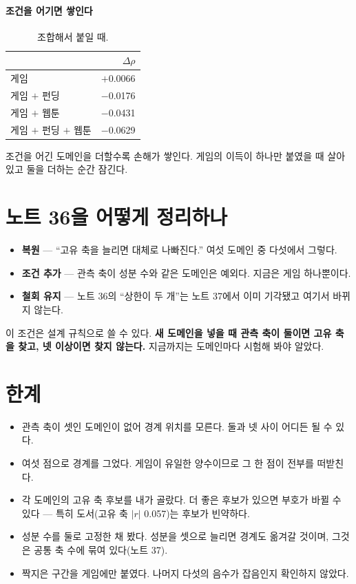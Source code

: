 \documentclass[10pt]{article}
\begin{document}
\paragraph{조건을 어기면 쌓인다}
\begin{table}[t]
\centering\tsize
\caption{조합해서 붙일 때.}
\begin{tabular}{lr}
\toprule
& $\Delta\rho$ \\
\midrule
게임 & $+$0.0066 \\
게임 $+$ 펀딩 & $-$0.0176 \\
게임 $+$ 웹툰 & $-$0.0431 \\
게임 $+$ 펀딩 $+$ 웹툰 & $-$0.0629 \\
\bottomrule
\end{tabular}
\end{table}

조건을 어긴 도메인을 더할수록 손해가 쌓인다. 게임의 이득이 하나만 붙였을 때
살아 있고 둘을 더하는 순간 잠긴다.

\section{노트 36을 어떻게 정리하나}

\begin{itemize}[leftmargin=1.1em,itemsep=0.2em]
\item \textbf{복원} --- ``고유 축을 늘리면 대체로 나빠진다.'' 여섯 도메인 중
      다섯에서 그렇다.
\item \textbf{조건 추가} --- 관측 축이 성분 수와 같은 도메인은 예외다. 지금은
      게임 하나뿐이다.
\item \textbf{철회 유지} --- 노트 36의 ``상한이 두 개''는 노트 37에서 이미
      기각됐고 여기서 바뀌지 않는다.
\end{itemize}

이 조건은 설계 규칙으로 쓸 수 있다. \textbf{새 도메인을 넣을 때 관측 축이
둘이면 고유 축을 찾고, 넷 이상이면 찾지 않는다.} 지금까지는 도메인마다 시험해
봐야 알았다.

\section{한계}

\begin{itemize}[leftmargin=1.1em,itemsep=0.15em]
\item 관측 축이 셋인 도메인이 없어 경계 위치를 모른다. 둘과 넷 사이 어디든 될
      수 있다.
\item 여섯 점으로 경계를 그었다. 게임이 유일한 양수이므로 그 한 점이 전부를
      떠받친다.
\item 각 도메인의 고유 축 후보를 내가 골랐다. 더 좋은 후보가 있으면 부호가
      바뀔 수 있다 --- 특히 도서(고유 축 $|r|$ 0.057)는 후보가 빈약하다.
\item 성분 수를 둘로 고정한 채 봤다. 성분을 셋으로 늘리면 경계도 옮겨갈 것이며,
      그것은 공통 축 수에 묶여 있다(노트 37).
\item 짝지은 구간을 게임에만 붙였다. 나머지 다섯의 음수가 잡음인지 확인하지 않았다.
\end{itemize}
\end{document}
